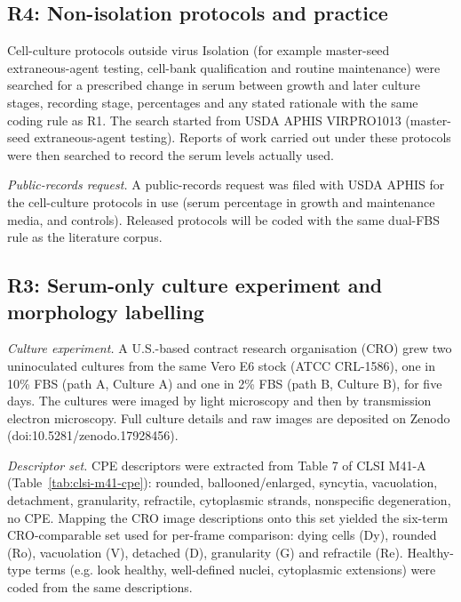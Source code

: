 \subsection*{R4: Non-isolation protocols and practice}
Cell-culture protocols outside virus Isolation (for example master-seed extraneous-agent testing, cell-bank qualification and routine maintenance) were searched for a prescribed change in serum between growth and later culture stages, recording stage, percentages and any stated rationale with the same coding rule as R1. The search started from USDA APHIS VIRPRO1013 (master-seed extraneous-agent testing). Reports of work carried out under these protocols were then searched to record the serum levels actually used. 

\emph{Public-records request.} A public-records request was filed with USDA APHIS for the cell-culture protocols in use (serum percentage in growth and maintenance media, and controls).  Released protocols will be coded with the same dual-FBS rule as the literature corpus.

\subsection*{R3: Serum-only culture experiment and morphology labelling}
\emph{Culture experiment.} A U.S.-based contract research organisation (CRO) grew two uninoculated cultures from the same Vero E6 stock (ATCC CRL-1586), one in 10\% FBS (path A, Culture A) and one in 2\% FBS (path B, Culture B), for five days. The cultures were imaged by light microscopy and then by transmission electron microscopy. Full culture details and raw images are deposited on Zenodo (doi:10.5281/zenodo.17928456).

\emph{Descriptor set.} CPE descriptors were extracted from Table 7 of CLSI M41-A (Table~\ref{tab:clsi-m41-cpe}): rounded, ballooned/enlarged, syncytia, vacuolation, detachment, granularity, refractile, cytoplasmic strands, nonspecific degeneration, no CPE. Mapping the CRO image descriptions onto this set yielded the six-term CRO-comparable set used for per-frame comparison: dying cells (Dy), rounded (Ro), vacuolation (V), detached (D), granularity (G) and refractile (Re). Healthy-type terms (e.g. look healthy, well-defined nuclei, cytoplasmic extensions) were coded from the same descriptions.



